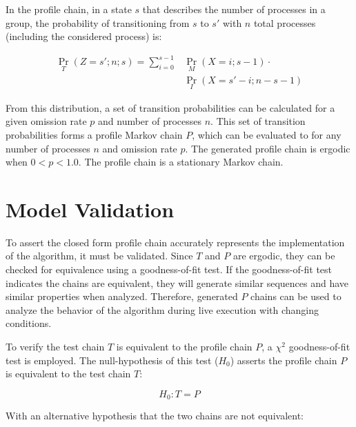 In the profile chain, in a state $s$ that describes the number of processes in a group, the probability of transitioning from $s$ to $s'$ with $n$ total processes (including the considered process) is:

\begin{align} \Pr_{T}(Z=s'; n; s) = \sum_{i=0}^{s-1} &\Pr_{M}(X=i; s-1) \cdot
\nonumber \\ &\Pr_{I}(X=s'-i; n-s-1) \end{align}

From this distribution, a set of transition probabilities can be calculated for a given omission rate $p$ and number of processes $n$.
This set of transition probabilities forms a profile Markov chain $P$, which can be evaluated to for any number of processes $n$ and omission rate $p$.
The generated profile chain is ergodic when $0<p<1.0$. The profile chain is a stationary Markov chain.

\section{Model Validation}


To assert the closed form profile chain accurately represents the implementation of the algorithm, it must be validated.
Since $T$ and $P$ are ergodic, they can be checked for equivalence using a goodness-of-fit test.
If the goodness-of-fit test indicates the chains are equivalent, they will generate similar sequences and have similar properties when analyzed.
Therefore, generated $P$ chains can be used to analyze the behavior of the algorithm during live execution with changing conditions.

To verify the test chain $T$ is equivalent to the profile chain $P$, a $\chi^2$ goodness-of-fit test is employed.
The null-hypothesis of this test ($H_{0}$) asserts the profile chain $P$ is equivalent to the test chain $T$:

\begin{equation} H_{0}: T = P \end{equation}

With an alternative hypothesis that the two chains are not equivalent:

